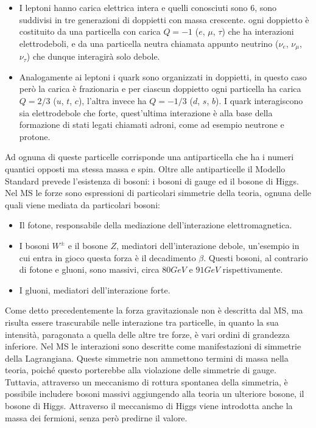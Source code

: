 \begin{itemize}
\item I leptoni hanno carica elettrica intera e quelli conosciuti sono 6, sono suddivisi in tre generazioni di doppietti con massa crescente. ogni doppietto è costituito da una particella con carica $Q=-1$ ($e$, $\mu$, $\tau$) che ha interazioni elettrodeboli, e da una particella neutra chiamata appunto neutrino ($\nu_e$, $\nu_{\mu}$, $\nu_{\tau}$) che dunque interagirà solo debole.

\item Analogamente ai leptoni i quark sono organizzati in doppietti, in questo caso però la carica è frazionaria e per ciascun doppietto ogni particella ha carica $Q=2/3$ ($u$, $t$, $c$), l'altra invece ha $Q=-1/3$ ($d$, $s$, $b$). I quark interagiscono sia elettrodebole che forte, quest'ultima interazione è alla base della formazione di stati legati chiamati adroni, come ad esempio neutrone e protone.
\end{itemize}

Ad ognuna di queste particelle corrisponde una antiparticella che ha i numeri quantici opposti ma stessa massa e spin. Oltre alle antiparticelle il Modello Standard prevede l'esistenza di bosoni: i bosoni di gauge ed il bosone di Higgs. 
Nel MS le forze sono espressioni di particolari simmetrie della teoria, ognuna delle quali viene mediata da particolari bosoni:

\begin{itemize}
\item Il fotone, responsabile della mediazione dell'interazione elettromagnetica.

\item I bosoni $W^{\pm}$ e il bosone $Z$, mediatori dell'interazione debole, un'esempio in cui entra in gioco questa forza è il decadimento $\beta$. Questi bosoni, al contrario di fotone e gluoni, sono massivi, circa $80 GeV$ e $91 GeV$ rispettivamente.

\item I gluoni, mediatori dell'interazione forte.
\end{itemize}

Come detto precedentemente la forza gravitazionale non è descritta dal MS, ma risulta essere trascurabile nelle interazione tra particelle, in quanto la sua intensità, paragonata a quella delle altre tre forze, è vari ordini di grandezza inferiore. Nel MS le interazioni sono descritte come manifestazioni di simmetrie della Lagrangiana. 
Queste simmetrie non ammettono termini di massa nella teoria, poiché questo porterebbe alla violazione delle
simmetrie di gauge. Tuttavia, attraverso un meccanismo di rottura spontanea della
simmetria, è possibile includere bosoni massivi aggiungendo alla teoria un ulteriore bosone, il bosone di Higgs. 
Attraverso il meccanismo di Higgs viene introdotta anche la massa dei fermioni, senza però predirne il valore.


